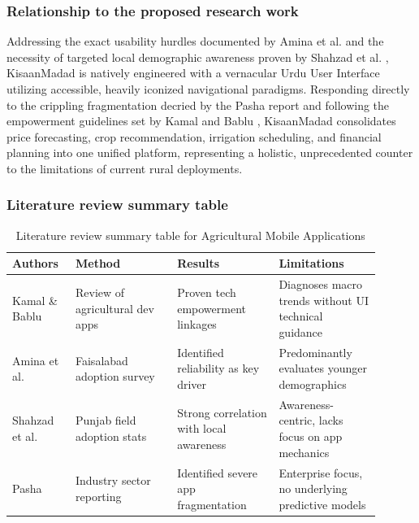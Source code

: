 \documentclass{FastFyp}
\begin{document}
\subsubsection{Relationship to the proposed research work}
Addressing the exact usability hurdles documented by Amina et al. \cite{amina2025factors} and the necessity of targeted local demographic awareness proven by Shahzad et al. \cite{shahzad2024mobile}, KisaanMadad is natively engineered with a vernacular Urdu User Interface utilizing accessible, heavily iconized navigational paradigms. Responding directly to the crippling fragmentation decried by the Pasha \cite{pasha2024agritech} report and following the empowerment guidelines set by Kamal and Bablu \cite{kamal2023mobile}, KisaanMadad consolidates price forecasting, crop recommendation, irrigation scheduling, and financial planning into one unified platform, representing a holistic, unprecedented counter to the limitations of current rural deployments.

\subsubsection{Literature review summary table}
\begin{table}[htbp]
  \centering
  \caption{Literature review summary table for Agricultural Mobile Applications}
  \label{tab:mobile_apps}
  \begin{tabular}{p{0.15\linewidth} p{0.25\linewidth} p{0.25\linewidth} p{0.25\linewidth}}
    \toprule
    \textbf{Authors} & \textbf{Method} & \textbf{Results} & \textbf{Limitations} \\
    \midrule
    Kamal \& Bablu \cite{kamal2023mobile} & Review of agricultural dev apps & Proven tech empowerment linkages & Diagnoses macro trends without UI technical guidance \\
    Amina et al. \cite{amina2025factors} & Faisalabad adoption survey & Identified reliability as key driver & Predominantly evaluates younger demographics \\
    Shahzad et al. \cite{shahzad2024mobile} & Punjab field adoption stats & Strong correlation with local awareness & Awareness-centric, lacks focus on app mechanics \\
    Pasha \cite{pasha2024agritech} & Industry sector reporting & Identified severe app fragmentation & Enterprise focus, no underlying predictive models \\
    \bottomrule
  \end{tabular}
\end{table}
\end{document}
